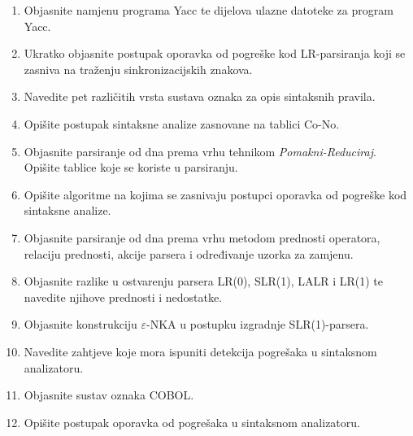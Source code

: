 \documentclass[times, 12pt, utf8]{book}
\begin{document}
\begin{enumerate}[resume]
\item
Objasnite namjenu programa Yacc te dijelova ulazne datoteke za program Yacc. \cite[str.~154-158]{udzbenik}

\item
Ukratko objasnite postupak oporavka od pogreške kod LR-parsiranja koji se zasniva na traženju sinkronizacijskih znakova. \cite[str.~153-154]{udzbenik}

\item
Navedite pet različitih vrsta sustava oznaka za opis sintaksnih pravila. \cite[str.~81-95]{udzbenik}

\item
Opišite postupak sintaksne analize zasnovane na tablici Co-No. \cite[str.~83-84]{udzbenik}

\item
Objasnite parsiranje od dna prema vrhu tehnikom \emph{Pomakni-Reduciraj}. 
Opišite tablice koje se koriste u parsiranju. \cite[str.~126-127]{udzbenik}

\item
Opišite algoritme na kojima se zasnivaju postupci oporavka od pogreške kod sintaksne analize. \cite[str.~113,153]{udzbenik}

\item
Objasnite parsiranje od dna prema vrhu metodom prednosti operatora, relaciju prednosti, akcije parsera i određivanje uzorka za zamjenu. \cite[str.~130-137]{udzbenik}

\item
Objasnite razlike u ostvarenju parsera LR(0), SLR(1), LALR i LR(1) te navedite njihove prednosti i nedostatke. \cite[str.~138]{udzbenik}

\item
Objasnite konstrukciju \(\varepsilon\)-NKA u postupku izgradnje SLR(1)-parsera. \cite[str.~147-149]{udzbenik}

\item
Navedite zahtjeve koje mora ispuniti detekcija pogrešaka u sintaksnom analizatoru. \cite[str.~79]{udzbenik}

\item
Objasnite sustav oznaka COBOL. \cite[str.~82]{udzbenik}

\item
Opišite postupak oporavka od pogrešaka u sintaksnom analizatoru. \cite[str.~79-80]{udzbenik}


\end{enumerate}
\end{document}
